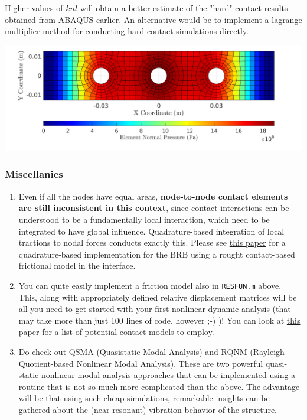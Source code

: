 \documentclass[11pt]{article}
\begin{document}
\begin{enumerate}
Higher values of \(knl\) will obtain a better estimate of the "hard" contact results obtained from ABAQUS earlier.
An alternative would be to implement a lagrange multiplier method for conducting hard contact simulations directly.
\begin{center}
\includegraphics[width=\textwidth]{./figs/intpress.png}
\end{center}
\end{enumerate}
\subsubsection{Miscellanies}
\label{sec:org43d2777}
\begin{enumerate}
\item Even if all the nodes have equal areas, \textbf{node-to-node contact elements are still inconsistent in this context}, since contact interactions can be understood to be a fundamentally local interaction, which need to be integrated to have global influence.
Quadrature-based integration of local tractions to nodal forces conducts exactly this.
Please see \href{https://www.sciencedirect.com/science/article/abs/pii/S0888327020300017}{this paper} for a quadrature-based implementation for the BRB using a rought contact-based frictional model in the interface.
\item You can quite easily implement a friction model also in \texttt{RESFUN.m} above.
This, along with appropriately defined relative displacement matrices will be all you need to get started with your first nonlinear dynamic analysis (that may take more than just 100 lines of code, however ;-) )!
You can look at \href{https://asmedigitalcollection.asme.org/appliedmechanicsreviews/article/72/4/040802/1084997/A-Review-of-Damping-Models-for-Structures-With?casa\_token=JWwE4Nf3808AAAAA:266N8zS75p4KrKsaZLrVHrnMfOSyZoq3urnmMf1QbWvJbDrWQYw6FJcpYFmffulGetIYTnMAlA}{this paper} for a list of potential contact models to employ.
\item Do check out \href{https://www.sciencedirect.com/science/article/abs/pii/S0888327018305739}{QSMA} (Quasistatic Modal Analysis) and \href{https://www.sciencedirect.com/science/article/abs/pii/S0045794919315160}{RQNM} (Rayleigh Quotient-based Nonlinear Modal Analysis).
These are two powerful quasi-static nonlinear modal analysis approaches that can be implemented using a routine that is not so much more complicated than the above.
The advantage will be that using such cheap simulations, remarkable insights can be gathered about the (near-resonant) vibration behavior of the structure.
\end{enumerate}
\end{document}
